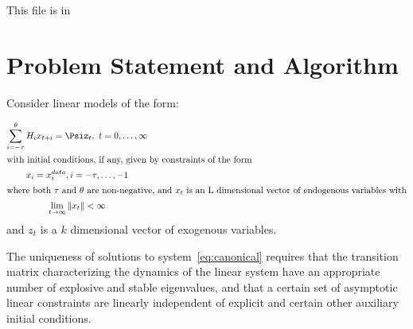 \documentclass[12pt]{article}
\begin{document}
This file is in

\noindent
 {\tiny \fullpath }


  \section{Problem Statement and Algorithm}
  

Consider linear models of the form:


\begin{gather}
\sum_{i=-\tau}^\theta{H_i x_{t+i}}= \Psi%
z_{t}, \,\, t = 0,\ldots,\infty\label{eq:canonical}\\ \intertext{with initial conditions, if any, given by constraints of the form}%
x_i  =  x^{data}_i,  i =  - \tau, \ldots, -1\label{eq:init}\\ \intertext{where both $\tau$ and $\theta$ are non-negative, and $x_t$ is an L dimensional vector 
of endogenous variables with}%
\lim_{ t \rightarrow\infty} \|x_t\|   < \infty\label{eq:limit} %
\end{gather}
{ and $z_t$ is a $k$ dimensional vector of exogenous variables.}


\label{sec:basic}

The uniqueness of solutions to 
system~\ref{eq:canonical} requires that
the transition matrix characterizing the dynamics of the 
linear system have an appropriate
number of explosive and stable eigenvalues\cite{blanchard80},
and that a certain set of  asymptotic linear constraints 
are linearly independent of explicit and certain other auxiliary initial 
conditions\cite{ANDER:AIM2}.
\end{document}
